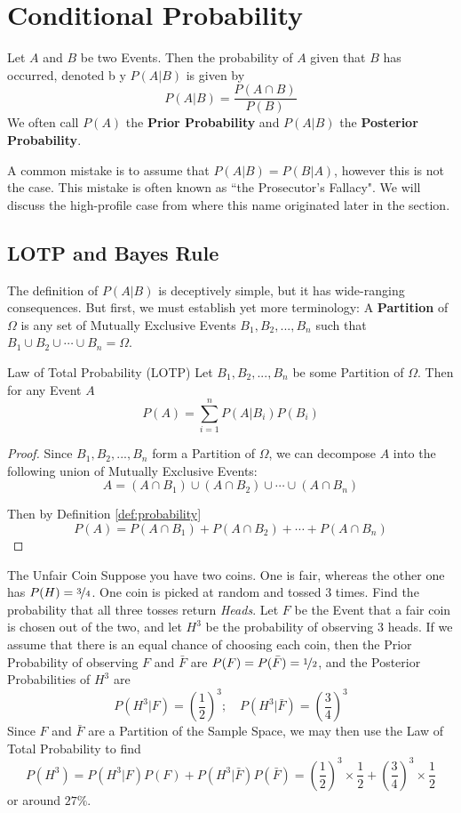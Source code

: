 \documentclass{report}
\begin{document}
\section{Conditional Probability}
Let $A$ and $B$ be two Events. Then the probability of $A$ given that $B$ has occurred, denoted b y $P(A\vert B)$ is given by
\[
    P(A\vert B)=\frac{P(A\cap B)}{P(B)}
\]
We often call $P(A)$ the \textbf{Prior Probability} and $P(A\vert B)$ the \textbf{Posterior Probability}.
\begin{notsofast}
    A common mistake is to assume that $P(A\vert B)=P(B\vert A)$, however this is not the case. This mistake is often known as ``the Prosecutor's Fallacy". We will discuss the high-profile case from where this name originated later in the section.
\end{notsofast}

\subsection{LOTP and Bayes Rule}
The definition of $P(A\vert B)$ is deceptively simple, but it has wide-ranging consequences. But first, we must establish yet more terminology: A \textbf{Partition} of $\Omega$ is any set of Mutually Exclusive Events $B_1,B_2,...,B_n$ such that $B_1\cup B_2\cup\cdots \cup B_n=\Omega$.

\begin{theorem}{Law of Total Probability (LOTP)}
Let $B_1,B_2,...,B_n$ be some Partition of $\Omega$. Then for any Event $A$
\[
    P(A)=\sum_{i=1}^n P(A\vert B_i) P(B_i)
\]
\tcblower
\begin{proof}
    Since $B_1,B_2,...,B_n$ form a Partition of $\Omega$, we can decompose $A$ into the following union of Mutually Exclusive Events:
    \[
        A=(A\cap B_1)\cup (A\cap B_2) \cup \cdots \cup (A\cap B_n)
    \]
    
    Then by Definition \ref{def:probability}
    \[
        P(A)=P(A\cap B_1)+ P(A\cap B_2)+ \cdots + P(A\cap B_n)
    \]
\end{proof}
\end{theorem}

\begin{example}{The Unfair Coin}
    Suppose you have two coins. One is fair, whereas the other one has $P(H)=\nicefrac 34$. One coin is picked at random and tossed 3 times. Find the probability that all three tosses return \emph{Heads}.
\tcblower
Let $F$ be the Event that a fair coin is chosen out of the two, and let $H^3$ be the probability of observing 3 heads. If we assume that there is an equal chance of choosing each coin, then the Prior Probability of observing $F$ and $\bar F$ are $P(F)=P(\bar F)=\nicefrac 12$, and the Posterior Probabilities of $H^3$ are
\[
    P(H^3 | F) = \left(\frac 12\right)^3;\quad P(H^3 | \bar F) = \left(\frac 34\right)^3
\]
Since $F$ and $\bar F$ are a Partition of the Sample Space, we may then use the Law of Total Probability to find
\[
    P(H^3) = P(H^3|F)P(F)+P(H^3|\bar F)P(\bar F)= \left(\frac 12\right)^3\times \frac 12 + \left(\frac 34\right)^3\times\frac 12
\]
or around $27\%$.
\end{example}
    
\end{document}
